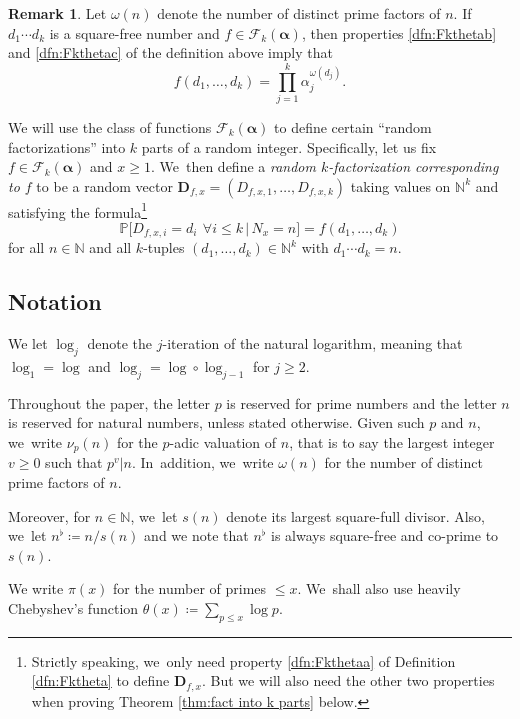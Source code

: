 \documentclass[10pt,a4paper]{article}
\newcommand{\bD}{{\boldsymbol D}}
\newcommand{\NN}{\mathbb{N}}
\newcommand{\PP}{\mathbb{P}}
\newcommand{\boldalpha}{\boldsymbol{\alpha}}
\newcommand{\bgg}{\Big}
\theoremstyle{plain}
\theoremstyle{definition}
\newtheorem*{rems}{Remark}
\begin{document}
\begin{rems}
Let $\omega(n)$ denote the number of distinct prime factors of $n$. If~$d_1\cdots d_k$ is a square-free number and $f\in\mathcal{F}_k (\boldalpha)$, then properties \eqref{dfn:Fkthetab} and \eqref{dfn:Fkthetac} of the definition above imply that
\begin{equation}
\label{eq:f on squarefrees}
f(d_1,\dots,d_k) = \prod_{j=1}^k \alpha_j^{\omega(d_j)}.
\end{equation}
\end{rems}

We will use the class of functions $\mathcal{F}_k(\boldalpha)$ to define certain ``random factorizations'' into $k$ parts of a random integer. Specifically, let us fix $f\in\mathcal{F}_k(\boldalpha)$ and $x\ge1$. We~then define a {\it random $k$-factorization corresponding to $f$} to be a random vector $\bD_{f, x}=(D_{f,x,1},\dots,D_{f,x,k})$ taking values on $\NN^k$ and satisfying the formula\footnote{Strictly speaking, we~only need property \eqref{dfn:Fkthetaa} of Definition \ref{dfn:Fktheta} to define $\bD_{f,x}$. But we will also need the other two properties when proving Theorem \ref{thm:fact into k parts} below.}
\begin{equation}
\label{eq:prob mass function f}
\PP\bgg[D_{f,x,i} = d_i \ \, \forall i \le k\, \bgg|\, N_x = n\bgg] = f(d_1, \ldots, d_k)
\end{equation}
for all $n\in\NN$ and all $k$-tuples $(d_1,\dots,d_k)\in\NN^k$ with $d_1\cdots d_k=n$.

\subsection{Notation}
We let $\log_j$ denote the $j$-iteration of the natural logarithm, meaning that $\log_1=\log$ and $\log_j=\log\circ \log_{j-1}$ for $j\ge2$.

Throughout the paper, the letter $p$ is reserved for prime numbers and the letter $n$ is reserved for natural numbers, unless stated otherwise. Given such $p$ and $n$, we~write $\nu_p(n)$ for the $p$-adic valuation of $n$, that is to say the largest integer $v\ge0$ such that $p^v|n$. In~addition, we~write $\omega(n)$ for the number of distinct prime factors of $n$.

Moreover, for $n\in\NN$, we~let $s(n)$ denote its largest square-full divisor. Also, we~let $n^\flat \coloneqq n/s(n)$ and we note that $n^\flat$ is always square-free and co-prime to $s(n)$.

We write $\pi(x)$ for the number of primes $\le x$. We~shall also use heavily Chebyshev's function $\theta(x) \coloneqq \sum_{p\le x}\log p$.
\end{document}
